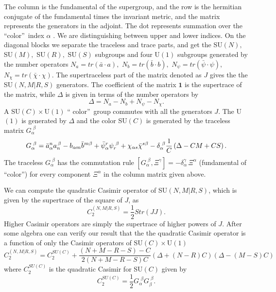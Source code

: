 \documentclass[a4paper,aps,preprint,nofootinbib]{revtex4}
\begin{document}
The column is the fundamental of the supergroup, and the row is the
hermitian conjugate of the fundamental times the invariant metric, and the
matrix represents the generators in the adjoint. The dot represents
summation over the \textquotedblleft color\textquotedblright\ index $\alpha$%
. We are distinguishing between upper and lower indices. On the diagonal
blocks we separate the traceless and trace parts, and get the SU$\left(
N\right) ,$ SU$\left( M\right) ,$ SU$\left( R\right) ,$ SU$\left( S\right) $
subgroups and four U$\left( 1\right) $ subgroups generated by the number
operators $N_{a}=tr\left( \bar{a}\cdot a\right) ,$ $N_{b}=tr\left( \bar
{b}%
\cdot b\right) ,$ $N_{\psi}=tr\left( \bar{\psi}\cdot\psi\right) ,$ $%
N_{\chi}=tr\left( \bar{\chi}\cdot\chi\right) $. The supertraceless part of
the matrix denoted as $J$ gives the the SU$(N,M|R,S)$ generators. The
coefficient of the matrix $\mathbf{1}$ is the supertrace of the matrix,
while $\Delta$ is given in terms of the number operators by
\begin{equation}
\Delta=N_{a}-N_{b}+N_{\psi}-N_{\chi}.
\end{equation}
A SU$\left( C\right) \times$U$\left( 1\right) $ \textquotedblleft
color\textquotedblright\ group commutes with all the generators
$J$. The U$\left( 1\right) $ is generated by $\Delta$ and the
color SU$\left( C\right) $ is generated by the traceless matrix
$G_{\alpha}^{\,\,\beta}$
\begin{equation}
G_{\alpha}^{\,\,\beta}=\bar{a}_{\alpha}^{n}a_{n}^{\,\beta}-b_{\alpha m}\bar {%
b}^{m\beta}+\bar{\psi}_{\alpha}^{r}\psi_{r}^{\,\,\beta}+\chi_{\alpha s}\bar{
\chi}^{s\beta}-\delta_{\alpha}^{\,\,\beta}\frac{1}{C}\left(
\Delta-CM+CS\right) .
\end{equation}
The traceless $G_{\alpha}^{\,\,\beta}$ has the commutation rule $\left[
G_{\alpha}^{\,\,\beta},\Xi^{\gamma}\right] =-\delta_{\alpha}^{\gamma}\,\Xi^{
\alpha}$ (fundamental of \textquotedblleft color\textquotedblright) for
every component $\Xi^{\alpha}$ in the column matrix given above.

We can compute the quadratic Casimir operator of SU$\left(
N,M|R,S\right) $, which is given by the supertrace of the square
of $J$, as
\begin{equation}
C_{2}^{\left( N,M|R,S\right) }=\frac{1}{2}Str\left( JJ\right) .
\end{equation}
Higher Casimir operators are simply the supertrace of higher powers of $J.$
After some algebra one can verify our result that the the quadratic Casimir
operator is a function of only the Casimir operators of SU$\left( C\right)
\times$U$\left( 1\right) $
\begin{equation}
C_{2}^{\left( N,M|R,S\right) }=C_{2}^{SU\left( C\right) }+\frac{\left(
N+M-R-S\right) -C}{2\left( N+M-R-S\right) C}\left( \Delta+\left( N-R\right)
C\right) \left( \Delta-\left( M-S\right) C\right)  \label{C2}
\end{equation}
where $C_{2}^{SU\left( C\right) }$ is the quadratic Casimir for SU$\left(
C\right) $ given by%
\begin{equation}
C_{2}^{SU\left( C\right) }=\frac{1}{2}G_{\alpha}^{\,\,\beta}G_{\beta
}^{\,\,\beta}.
\end{equation}
\end{document}
